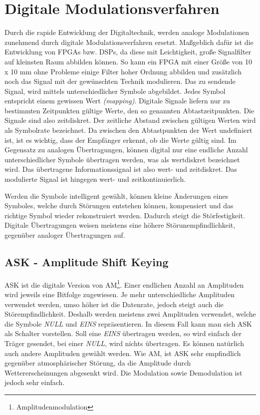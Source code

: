 \section{Digitale Modulationsverfahren}
Durch die rapide Entwicklung der Digitaltechnik, werden analoge Modulationen zunehmend durch digitale Modulationsverfahren ersetzt. Maßgeblich dafür ist die Entwicklung von FPGAs bzw. DSPs, da diese mit Leichtigkeit, große Signalfilter auf kleinsten Raum abbilden können. So kann ein FPGA mit einer Größe von 10 x 10 mm ohne Probleme einige Filter hoher Ordnung abbilden und zusätzlich noch das Signal mit der gewünschten Technik modulieren. Das zu sendende Signal, wird mittels unterschiedlicher Symbole abgebildet. Jedes Symbol entspricht einem gewissen Wert \emph{(mapping)}. Digitale Signale liefern nur zu bestimmten Zeitpunkten gültige Werte, den so genannten Abtastzeitpunkten. Die Signale sind also zeitdiskret. Der zeitliche Abstand zwischen gültigen Werten wird als Symbolrate bezeichnet. Da zwischen den Abtastpunkten der Wert undefiniert ist, ist es wichtig, dass der Empfänger erkennt, ob die Werte gültig sind. Im Gegensatz zu analogen Übertragungen, können digital nur eine endliche Anzahl unterschiedlicher Symbole übertragen werden, was als wertdiskret bezeichnet wird. Das übertragene Informationssignal ist also wert- und zeitdiskret. Das modulierte Signal ist hingegen wert- und zeitkontinuierlich.

Werden die Symbole intelligent gewählt, können kleine Änderungen eines Symboles, welche durch Störungen entstehen können, kompensiert und das richtige Symbol wieder rekonstruiert werden. Dadurch steigt die Störfestigkeit. Digitale Übertragungen weisen meistens eine höhere Störunempfindlichkeit, gegenüber analoger Übertragungen auf.

\subsection{ASK - Amplitude Shift Keying}
ASK ist die digitale Version von AM\footnote{Amplitudenmodulation}. Einer endlichen Anzahl an Amplituden wird jeweils eine Bitfolge zugewiesen. Je mehr unterschiedliche Amplituden verwendet werden, umso höher ist die Datenrate, jedoch steigt auch die Störempfindlichkeit. Deshalb werden meistens zwei Amplituden verwendet, welche die Symbole \emph{NULL} und \emph{EINS} repräsentieren. In diesem Fall kann man sich ASK als Schalter vorstellen. Soll eine \emph{EINS} übertragen werden, so wird einfach der Träger gesendet, bei einer \emph{NULL}, wird nichts übertragen. Es können natürlich auch andere Amplituden gewählt werden. Wie AM, ist ASK sehr empfindlich gegenüber atmosphärischer Störung, da die Amplitude durch Wettererscheinungen abgesenkt wird. Die Modulation sowie Demodulation ist jedoch sehr einfach.

